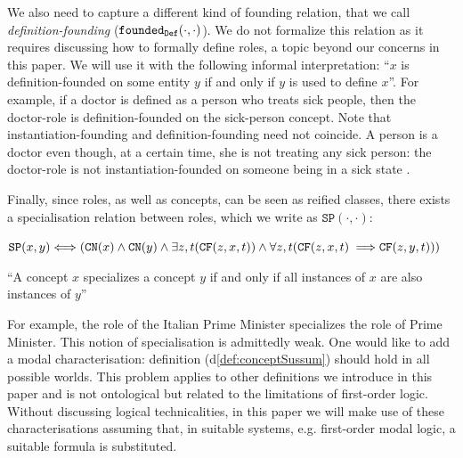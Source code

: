 \documentclass[sw]{iosart2x}
\newcommand{\bflist}{\begin{list}{}{\setlength{\topsep}{2mm}\setlength{\partopsep}{0mm}\setlength{\parsep}{0mm}\setlength{\leftmargin}{9mm}\setlength{\labelwidth}{8mm}}}
\newcommand{\eflist}{\end{list}}
\newcommand{\AxLabel}{\textrm{a}}
\newcommand{\DefLabel}{\textrm{d}}
\newcounter{cntax}
\newcommand{\myax}[1]{\refstepcounter{cntax}\begin{small}{\bf \AxLabel\thecntax\label{ax:#1}}\end{small}}
\newcounter{cntdef}
\newcommand{\mydf}[1]{\refstepcounter{cntdef}\begin{small}{\bf \DefLabel\thecntdef\label{def:#1}}\end{small}}
\newcommand{\mytext}[1]{``#1''}
\newcommand{\refdf}[1]{({\DefLabel}\ref{#1})}
\newcommand{\generalStyle}[1]{\texttt{#1}}
\newcommand{\biRel}[3]{\generalStyle{#1}(#2,#3)}
\newcommand{\uniRel}[2]{\generalStyle{#1}(#2)}
\newcommand{\biRelPar}[4]{\generalStyle{#1}_{\generalStyle{#4}}(#2,#3)}
\newcommand{\triRel}[4]{\generalStyle{#1}(#2,#3,#4)}
\newcommand{\myiff}{\Longleftrightarrow}
\newcommand{\myfi}{\hspace{0.9mm} \Longrightarrow}
\newcommand{\DOLCEConcept}[1]{\uniRel{{CN}}{#1}}
\newcommand{\DOLCECLby}[3]{\triRel{CF}{#1}{#2}{#3}}
\newcommand{\DOLCEConceptSubsum}[2]{\biRel{SP}{#1}{#2}}
\newcommand{\foundedDef}[2]{\biRelPar{\foundedTerm{passive}}{#1}{#2}{Def}}
\newcommand{\firstTimeKeyWord}[1]{\textit{#1}}
\newcommand{\foundedTerm}[1]{%
  \ifthenelse{\equal{#1}{passive}}{founded}{%
    \ifthenelse{\equal{#1}{verb}}{found}{%
      \ifthenelse{\equal{#1}{gerund}}{founding}{%
        ERROR!%
      }%
    }%
  }%
}
\newcommand{\TODO}[1]{{%
}}
\newcommand{\TODOinline}[1]{{%
}}
\begin{document}
We also need to capture a different kind of founding relation, that we call \firstTimeKeyWord{definition-founding} ($\foundedDef{\cdot}{\cdot}$). We do not formalize this relation as it requires discussing how to formally define roles, a topic beyond our concerns in this paper. We will use it with the following informal interpretation: \mytext{$x$ is definition-founded on some entity $y$ if and only if $y$ is used to define $x$}.
For example, if a doctor is defined as a person who treats sick people, then the doctor-role is definition-founded on the sick-person concept. %
Note that instantiation-founding and definition-founding need not  coincide. A person is a doctor even though, at a certain time, she is not treating any sick person: the doctor-role is not instantiation-founded on someone being in a sick state\TODO{S: on someone being in a sick state}.

Finally, since roles, as well as concepts, can be seen as reified classes, there exists a specialisation relation between roles, which we write as $\DOLCEConceptSubsum{\cdot}{\cdot}$:
\bflist
\item[\mydf{conceptSussum}] $ \DOLCEConceptSubsum{x}{y} \myiff (\DOLCEConcept{x} \land \DOLCEConcept{y} \land \exists z,t (\DOLCECLby{z}{x}{t}) \land \forall z,t (\DOLCECLby{z}{x}{t} \myfi \DOLCECLby{z}{y}{t}) )$%
\item \mytext{A concept $x$ specializes a concept $y$ if and only if all instances of $x$ are also instances of $y$} 
\eflist
For example, the role of the Italian Prime Minister specializes the role of Prime Minister.
{This notion of specialisation is admittedly weak. One would like to add a modal characterisation: definition \refdf{def:conceptSussum} should hold in all possible worlds. This problem applies to other definitions we introduce in this paper %
and is not ontological but related to the limitations of first-order logic. Without discussing logical technicalities, in this paper we will make use of these characterisations assuming that, in suitable systems, e.g. first-order modal logic, a suitable formula is substituted.}
\end{document}
